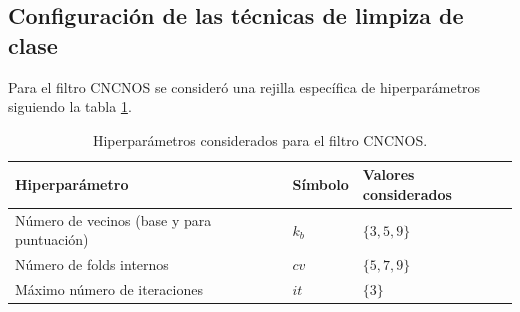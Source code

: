 \documentclass[print, color]{ugrTFG}
\begin{document}
    \subsection{Configuración de las técnicas de limpiza de clase}
    Para el filtro CNCNOS se consideró una rejilla específica de hiperparámetros siguiendo la tabla \ref{tab:hiperparametros_cncnos}.

    
    \begin{table}[htbp]
        \centering
        \begin{tabular}{lll}
        \hline
        \textbf{Hiperparámetro} & \textbf{Símbolo} & \textbf{Valores considerados} \\
        \hline
        Número de vecinos (base y para puntuación) & $k_b$ & $\{3,5,9\}$ \\
        Número de folds internos & $cv$ & $\{5,7,9\}$ \\
        Máximo número de iteraciones & $it$ & $\{3\}$ \\
        \hline
        \end{tabular}
        \caption{Hiperparámetros considerados para el filtro CNCNOS.}
        \label{tab:hiperparametros_cncnos}
    \end{table}
\end{document}
